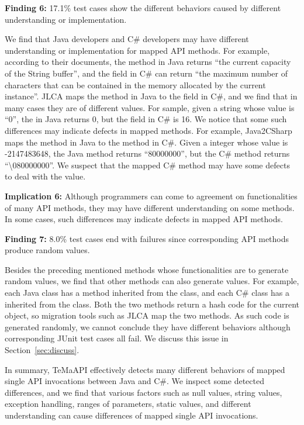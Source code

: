 \textbf{Finding 6:} 17.1\% test cases show the different behaviors caused by different understanding or implementation.

We find that Java developers and C\# developers may have different understanding or implementation for mapped API methods. For example, according to their documents, the  method in Java returns ``the current capacity of the String buffer'', and the  field in C\# can return ``the maximum number of characters that can be contained in the memory allocated by the current instance''. JLCA maps the method in Java to the field in C\#, and we find that in many cases they are of different values. For sample, given a string whose value is ``0'', the  in Java returns 0, but the  field in C\# is 16. We notice that some such differences may indicate defects in mapped methods. For example, Java2CSharp maps the  method in Java to the  method in C\#. Given a integer whose value is -2147483648, the Java method returns ``80000000'', but the C\# method returns ``\textbackslash080000000''. We suspect that the mapped C\# method may have some defects to deal with the value.

\textbf{Implication 6:} Although programmers can come to agreement on functionalities of many API methods, they may have different understanding on some methods. In some cases, such differences may indicate defects in mapped API methods.

\textbf{Finding 7:} 8.0\% test cases end with failures since corresponding API methods produce random values.

Besides the preceding mentioned methods whose functionalities are to generate random values, we find that other methods can also generate values. For example, each Java class has a  method inherited from the  class, and each C\# class has a  inherited from the  class. Both the two methods return a hash code for the current object, so migration tools such as JLCA map the two methods. As such code is generated randomly, we cannot conclude they have different behaviors although corresponding JUnit test cases all fail. We discuss this issue in Section~\ref{sec:discuss}.

In summary, TeMaAPI effectively detects many different behaviors of mapped single API invocations between Java and C\#. We inspect some detected differences, and we find that various factors such as null values, string values, exception handling, ranges of parameters, static values, and different understanding can cause differences of mapped single API invocations.

